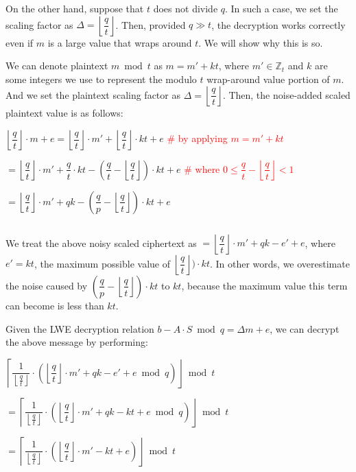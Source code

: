 On the other hand, suppose that $t$ does not divide $q$. In such a case, we set the scaling factor as $\Delta = \left\lfloor\dfrac{q}{t}\right\rfloor$. Then, provided $q \gg t$, the decryption works correctly even if $m$ is a large value that wraps around $t$. We will show why this is so. 

We can denote plaintext $m \bmod t$ as $m = m' + kt$, where $m' \in \mathbb{Z}_t$ and $k$ are some integers we use to represent the modulo $t$ wrap-around value portion of $m$. And we set the plaintext scaling factor as $\Delta = \left\lfloor\dfrac{q}{t}\right\rfloor$. Then, the noise-added scaled plaintext value is as follows:

$\left\lfloor\dfrac{q}{t}\right\rfloor\cdot m + e = \left\lfloor\dfrac{q}{t}\right\rfloor\cdot m' + \left\lfloor\dfrac{q}{t}\right\rfloor\cdot kt + e$   \textcolor{red}{ \# by applying $m = m' + kt$}

$= \left\lfloor\dfrac{q}{t}\right\rfloor\cdot m' + \dfrac{q}{t}\cdot kt - (\dfrac{q}{t} - \left\lfloor\dfrac{q}{t}\right\rfloor)\cdot kt + e$  \textcolor{red}{ \# where $0 \leq \dfrac{q}{t} - \left\lfloor\dfrac{q}{t}\right\rfloor < 1$}

$= \left\lfloor\dfrac{q}{t}\right\rfloor\cdot m' + qk - (\dfrac{q}{p} - \left\lfloor\dfrac{q}{t}\right\rfloor)\cdot kt + e$

$ $

We treat the above noisy scaled ciphertext as $= \left\lfloor\dfrac{q}{t}\right\rfloor\cdot m' + qk - e' + e$, where $e' = kt$, the maximum possible value of $\left\lfloor\dfrac{q}{t}\right\rfloor)\cdot kt$. In other words, we overestimate the noise caused by $(\dfrac{q}{p} - \left\lfloor\dfrac{q}{t}\right\rfloor)\cdot kt$ to $kt$, because the maximum value this term can become is less than $kt$.

Given the LWE decryption relation $b - A\cdot S \bmod q = \Delta m + e$, we can decrypt the above message by performing:

$\left\lceil\dfrac{1}{\left\lfloor\frac{q}{t}\right\rfloor} \cdot \left(\left\lfloor\dfrac{q}{t}\right\rfloor\cdot m' + qk - e' + e \bmod q\right)\right\rfloor \bmod t$

$= \left\lceil\dfrac{1}{\left\lfloor\frac{q}{t}\right\rfloor} \cdot \left(\left\lfloor\dfrac{q}{t}\right\rfloor\cdot m' + qk - kt + e \bmod q\right)\right\rfloor \bmod t$

$= \left\lceil\dfrac{1}{\left\lfloor\frac{q}{t}\right\rfloor} \cdot \left(\left\lfloor\dfrac{q}{t}\right\rfloor\cdot m'  - kt + e \right)\right\rfloor \bmod t$

